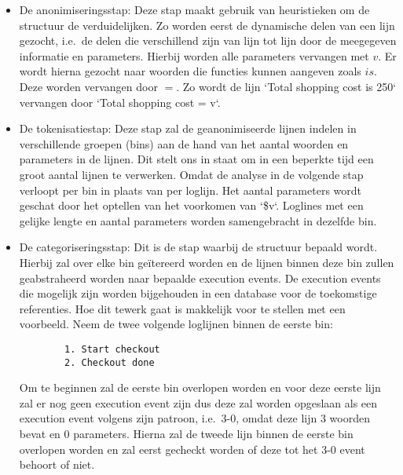 \begin{itemize}
    \item De anonimiseringsstap: Deze stap maakt gebruik van heuristieken om de structuur de verduidelijken. Zo worden eerst de dynamische delen van een lijn gezocht, i.e.\ de delen die verschillend zijn van lijn tot lijn door de meegegeven informatie en parameters. Hierbij worden alle parameters vervangen met $v$. Er wordt hierna gezocht naar woorden die functies kunnen aangeven zoals $is$. Deze worden vervangen door $=$. Zo wordt de lijn `Total shopping cost is 250` vervangen door `Total shopping cost = v`.\\
    
    \item De tokenisatiestap: Deze stap zal de geanonimiseerde lijnen indelen in verschillende groepen (bins) aan de hand  van het aantal woorden en parameters in de lijnen. Dit stelt ons in staat om in een beperkte tijd een groot aantal lijnen te verwerken. Omdat de analyse in de volgende stap verloopt per bin in plaats van per loglijn. Het aantal parameters wordt geschat door het optellen van het voorkomen van `\$v`. Loglines met een gelijke lengte en aantal parameters worden samengebracht in dezelfde bin.\\
    
    \item De categoriseringsstap: Dit is de stap waarbij de structuur bepaald wordt. Hierbij zal over elke bin geïtereerd worden en de lijnen binnen deze bin zullen geabstraheerd worden naar bepaalde execution events. De execution events die mogelijk zijn worden bijgehouden in een database voor de toekomstige referenties. Hoe dit tewerk gaat is makkelijk voor te stellen met een voorbeeld. Neem de twee volgende loglijnen binnen de eerste bin:
    \begin{verbatim}
        1. Start checkout
        2. Checkout done
    \end{verbatim}
    Om te beginnen zal de eerste bin overlopen worden en voor deze eerste lijn zal er nog geen execution event zijn dus deze zal worden opgeslaan als een execution event volgens zijn patroon, i.e.\ 3-0, omdat deze lijn 3 woorden bevat en 0 parameters. Hierna zal de tweede lijn binnen de eerste bin overlopen worden en zal eerst gecheckt worden of deze tot het 3-0 event behoort of niet.\\
    

\end{itemize}
